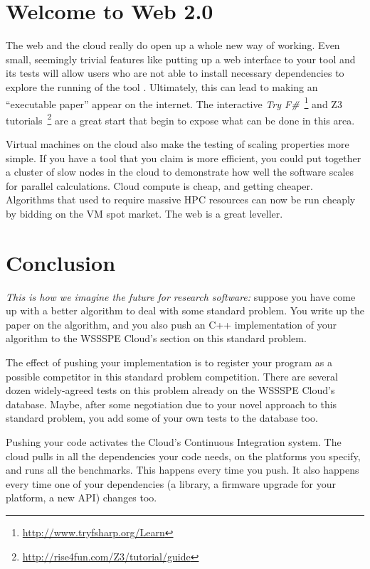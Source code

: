 \documentclass[conference]{IEEEtran}
\begin{document}
\section{Welcome to Web 2.0} 

The web and the cloud really do open up a whole new way of
working. Even small, seemingly trivial features like putting up a web
interface to your tool and its tests will allow users who are not able
to install necessary dependencies to explore the running of the tool
\cite{Hall2014}. Ultimately, this can lead to making an ``executable
paper'' appear on the internet. The interactive {\em Try
F\#}~\footnote{\url{http://www.tryfsharp.org/Learn}} and Z3
tutorials~\footnote{\url{http://rise4fun.com/Z3/tutorial/guide}} are a
great start that begin to expose what can be done in this area.

Virtual machines on the cloud also make the testing of scaling
properties more simple.  If you have a tool that you claim is more
efficient, you could put together a cluster of slow nodes in the cloud
to demonstrate how well the software scales for parallel calculations.
Cloud compute is cheap, and getting cheaper. Algorithms that used to
require massive HPC resources can now be run cheaply by bidding on the
VM spot market. The web is a great leveller.


\section{Conclusion}
\label{sec:Conclusion} 

{\emph{This is how we imagine the future for research software:}} suppose you
have come up with a better algorithm to deal with some standard
problem.  You write up the paper on the algorithm, and you also push
an C++ implementation of your algorithm to the WSSSPE Cloud's section
on this standard problem.

The effect of pushing your implementation is to register your program
as a possible competitor in this standard problem competition. There
are several dozen widely-agreed tests on this problem already on the
WSSSPE Cloud's database. Maybe, after some negotiation due to your
novel approach to this standard problem, you add some of your
own tests to the database too.

Pushing your code activates the Cloud's Continuous Integration
system.  The cloud pulls in all the dependencies your code needs, on
the platforms you specify, and runs all the benchmarks. This happens
every time you push. It also happens every time one of your
dependencies (a library, a firmware upgrade for your platform, a new
API) changes too.
\end{document}
